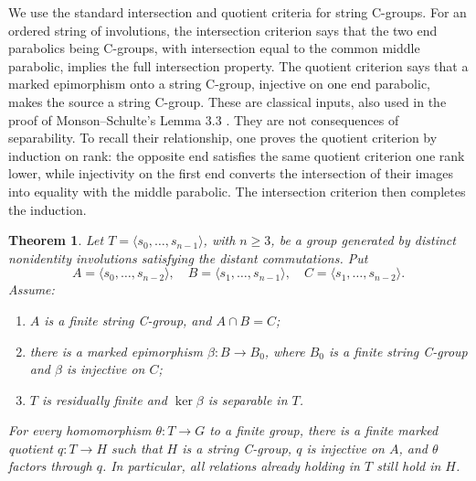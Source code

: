 \documentclass[11pt]{article}
\newtheorem{theorem}{Theorem}[section]
\theoremstyle{remark}\newtheorem{remark}[theorem]{Remark}
\newcommand{\gen}[1]{\langle #1\rangle}
\begin{document}
We use the standard intersection and quotient criteria for string C-groups.
For an ordered string of involutions, the intersection criterion says that
the two end parabolics being C-groups, with intersection equal to the common
middle parabolic, implies the full intersection property. The quotient
criterion says that a marked epimorphism onto a string C-group, injective
on one end parabolic, makes the source a string C-group. These are classical
inputs, also used in the proof of Monson--Schulte's Lemma 3.3
\cite{MS}. They are not consequences of separability. To recall their
relationship, one proves the quotient criterion by induction on rank:
the opposite end satisfies the same quotient criterion one rank lower,
while injectivity on the first end converts the intersection of their
images into equality with the middle parabolic. The intersection criterion
then completes the induction.

\begin{theorem}\label{thm:facet}
Let \(T=\gen{s_0,\ldots,s_{n-1}}\), with \(n\geq3\), be a group generated
by distinct nonidentity involutions satisfying the distant commutations.
Put
\[
 A=\gen{s_0,\ldots,s_{n-2}},\quad
 B=\gen{s_1,\ldots,s_{n-1}},\quad
 C=\gen{s_1,\ldots,s_{n-2}}.
\]
Assume:
\begin{enumerate}[label=(\roman*),leftmargin=2em]
\item \(A\) is a finite string C-group, and \(A\cap B=C\);
\item there is a marked epimorphism \(\beta:B\to B_0\), where \(B_0\)
is a finite string C-group and \(\beta\) is injective on \(C\);
\item \(T\) is residually finite and \(\ker\beta\) is separable in \(T\).
\end{enumerate}
For every homomorphism \(\theta:T\to G\) to a finite group, there is a
finite marked quotient \(q:T\to H\) such that \(H\) is a string C-group,
\(q\) is injective on \(A\), and \(\theta\) factors through \(q\).
In particular, all relations already holding in \(T\) still hold in \(H\).
\end{theorem}
\end{document}
